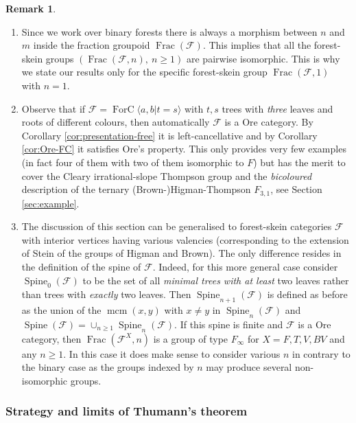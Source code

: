\documentclass[a4paper, 12pt]{amsart}
\numberwithin{equation}{section}
\theoremstyle{definition}
\newtheorem{remark}[theorem]{Remark}
\newcommand{\cF}{\mathcal F}
\DeclareMathOperator{\Frac}{Frac}
\DeclareMathOperator{\FC}{ForC}
\newcommand{\la}{\langle}
\DeclareMathOperator{\mcm}{mcm}
\newcommand{\ra}{\rangle}
\DeclareMathOperator{\Sp}{Spine}
\begin{document}
\begin{remark}\label{rem:Stein-Finfty}
\begin{enumerate}
\item Since we work over binary forests there is always a morphism between $n$ and $m$ inside the fraction groupoid $\Frac(\cF)$.
This implies that all the forest-skein groups $(\Frac(\cF,n),\ n\geq 1)$ are pairwise isomorphic. 
This is why we state our results only for the specific forest-skein group $\Frac(\cF,1)$ with $n=1$.
\item
Observe that if $\cF=\FC\la a,b| t=s\ra$ with $t,s$ trees with {\it three} leaves and roots of different colours, then automatically $\cF$ is a Ore category.
By Corollary \ref{cor:presentation-free} it is left-cancellative and by Corollary \ref{cor:Ore-FC} it satisfies Ore's property.
This only provides very few examples (in fact four of them with two of them isomorphic to $F$) but has the merit to cover the Cleary irrational-slope Thompson group and the {\it bicoloured} description of the ternary (Brown-)Higman-Thompson $F_{3,1}$, see Section \ref{sec:example}.
\item
The discussion of this section can be generalised to forest-skein categories $\cF$ with interior vertices having various valencies (corresponding to the extension of Stein of the groups of Higman and Brown).
The only difference resides in the definition of the spine of $\cF$. 
Indeed, for this more general case consider $\Sp_0(\cF)$ to be the set of all  {\it minimal trees with  at least} two leaves rather than trees with {\it exactly} two leaves.
Then $\Sp_{n+1}(\cF)$ is defined as before as the union of the $\mcm(x,y)$ with $x\neq y$ in $\Sp_n(\cF)$ and $\Sp(\cF)=\cup_{n\geq 1} \Sp_n(\cF).$
If this spine is finite and $\cF$ is a Ore category, then $\Frac(\cF^X,n)$ is a group of type $F_\infty$ for $X=F,T,V,BV$ and any $n\geq 1$.
In this case it does make sense to consider various $n$ in contrary to the binary case as the groups indexed by $n$ may produce several non-isomorphic groups.
\end{enumerate}
\end{remark}

\subsubsection{Strategy and limits of Thumann's theorem}\label{sec:rebel}
\end{document}
